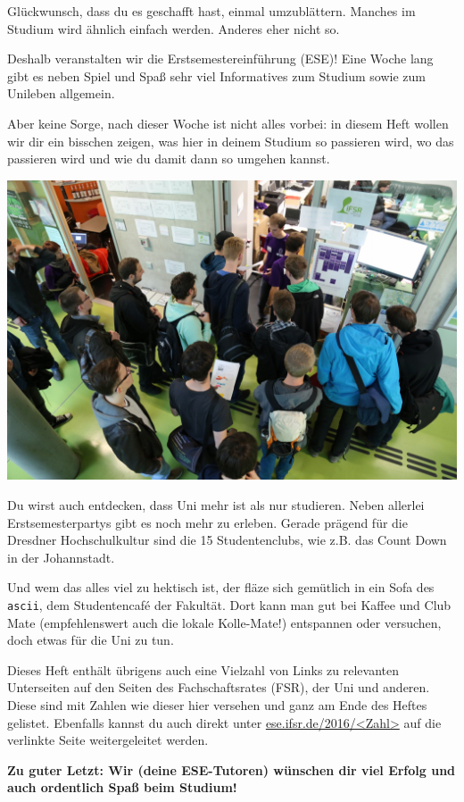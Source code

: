 
Glückwunsch, dass du es geschafft hast, einmal umzublättern.
Manches im Studium wird ähnlich einfach werden. Anderes eher nicht so.

Deshalb veranstalten wir die Erstsemestereinführung (ESE)!
Eine Woche lang gibt es neben Spiel und Spaß sehr viel Informatives zum Studium sowie zum Unileben allgemein.

Aber keine Sorge, nach dieser Woche ist nicht alles vorbei: in diesem Heft wollen wir dir ein bisschen zeigen, was hier in deinem Studium so passieren wird, wo das passieren wird und wie du damit dann so umgehen kannst.

\begin{minipage}{.65\textwidth}
  \includegraphics[width=\textwidth]{img/ese2015/bueroansturm.jpg}
\end{minipage}%
\hspace*{.6cm}%
\begin{minipage}{.3\textwidth}
  \vspace*{1.5em}
  Du wirst auch entdecken, dass Uni mehr ist als nur studieren.
  Neben allerlei Erstsemesterpartys gibt es noch mehr zu erleben.
  Gerade prägend für die Dresdner Hochschulkultur sind die 15 Studentenclubs, wie z.B. das Count Down in der Johannstadt.\\[1em]
\end{minipage}

Und wem das alles viel zu hektisch ist, der fläze sich gemütlich in ein Sofa des \texttt{ascii}, dem Studentencafé der Fakultät. 
Dort kann man gut bei Kaffee und Club Mate (empfehlenswert auch die lokale Kolle-Mate!) entspannen oder versuchen, doch etwas für die Uni zu tun.

Dieses Heft enthält übrigens auch eine Vielzahl von Links zu relevanten Unterseiten auf den Seiten des Fachschaftsrates (FSR), der Uni und anderen.
Diese sind mit Zahlen wie dieser hier  versehen und ganz am Ende des Heftes gelistet. Ebenfalls kannst du auch direkt unter \url{ese.ifsr.de/2016/<Zahl>} auf die verlinkte Seite weitergeleitet werden.

\textbf{Zu guter Letzt: Wir (deine ESE-Tutoren) wünschen dir viel Erfolg und auch ordentlich Spaß beim Studium!}
